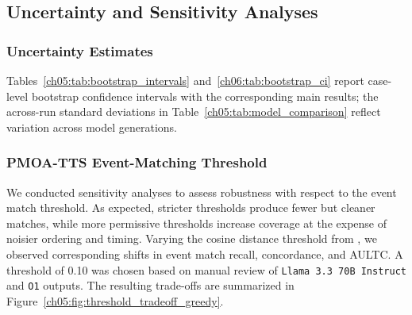 \subsection{Uncertainty and Sensitivity Analyses}
\label{ch05:apd:sensitivity-analyses}

\ChFiveHeadingOnly

\subsubsection{Uncertainty Estimates}

Tables~\ref{ch05:tab:bootstrap_intervals} and~\ref{ch06:tab:bootstrap_ci} report case-level bootstrap confidence intervals with the corresponding main results; the across-run standard deviations in Table~\ref{ch05:tab:model_comparison} reflect variation across model generations.

\subsubsection{PMOA-TTS Event-Matching Threshold}

We conducted sensitivity analyses to assess robustness with respect to the event match threshold.
As expected, stricter thresholds produce fewer but cleaner matches, while more permissive thresholds increase coverage at the expense of noisier ordering and timing.
Varying the cosine distance threshold from , we observed corresponding shifts in event match recall, concordance, and AULTC.
A threshold of 0.10 was chosen based on manual review of \texttt{Llama 3.3 70B Instruct} and \texttt{O1} outputs.
The resulting trade-offs are summarized in Figure~\ref{ch05:fig:threshold_tradeoff_greedy}.






